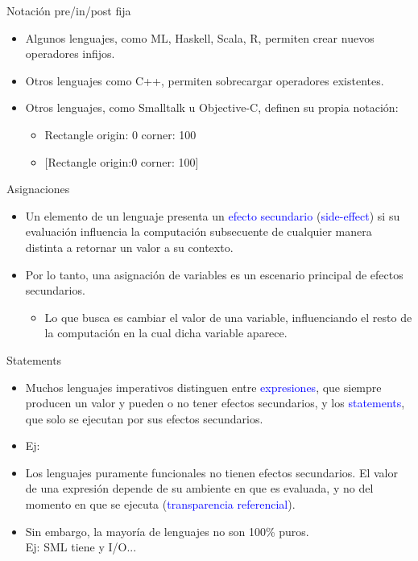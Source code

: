 \documentclass[handout]{beamer} %
\newcommand{\blue}[1]{\textcolor{blue}{#1}}
\newcommand{\redb}[1]{{\color{red!70!black}{#1}}}
\begin{document}
\begin{frame}{Notación pre/in/post fija}
  \begin{itemize}
    \item<1-> Algunos lenguajes, como ML, Haskell, Scala, R, permiten crear nuevos operadores infijos.
    \item<2-> Otros lenguajes como C++, permiten sobrecargar operadores existentes.
    \item<3-> Otros lenguajes, como Smalltalk u Objective-C, definen su propia notación:
    \begin{itemize}
        \item Rectangle origin: 0 corner: 100
        \item $[$Rectangle origin:0 corner: 100$]$
    \end{itemize}
  \end{itemize}
\end{frame}

\begin{frame}{Asignaciones}
  \begin{itemize}
    \item Un elemento de un lenguaje presenta un \blue{efecto secundario} (\blue{side-effect}) si su evaluación influencia la computación subsecuente de cualquier manera distinta a retornar un valor a su contexto.
    \item Por lo tanto, una asignación de variables es un escenario principal de efectos secundarios.
    \begin{itemize}
        \item Lo que busca es cambiar el valor de una variable, influenciando el resto de la computación en la cual dicha variable aparece.
    \end{itemize}
  \end{itemize}
\end{frame}

\begin{frame}{Statements}
  \begin{itemize}
    \item<1-> Muchos lenguajes imperativos distinguen entre \blue{expresiones}, que siempre producen un valor y  pueden o no tener efectos secundarios, y los \blue{statements}, que solo se ejecutan por sus efectos secundarios.
    \item<2-> Ej: 
    \item<4-> Los lenguajes puramente funcionales no tienen efectos secundarios. El valor de una expresión depende de su ambiente en que es evaluada, y no del momento en que se ejecuta (\blue{transparencia referencial}).
    \item<5-> Sin embargo, la mayoría de lenguajes no son 100\% puros.\\Ej: SML tiene \redb{referencias} y I/O...
  \end{itemize}
\end{frame}
\end{document}
